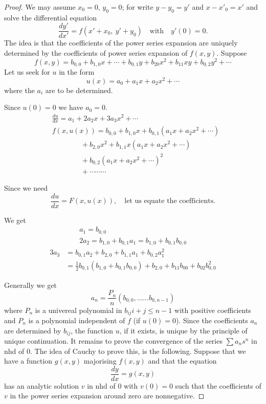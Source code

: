 \begin{proof}
We may assume $x_{0}=0$, $y_{0}=0$; for write $y-y_{0}=y'$ and $x-x'_{0}=x'$ and solve the differential equation
$$
\frac{dy'}{dx'}=f(x'+x_{0}, \ y'+y_{0})\quad\text{with}\quad y'(0)=0.
$$
The idea is that the coefficients of the power series expansion are uniquely determined by the coefficients of power series expansion of $f(x,y)$. Suppose
$$
f(x,y)=b_{0,0}+b_{1,0}x+\cdots+b_{0,1}y+b_{20}x^{2}+b_{11}xy+b_{0,2}y^{2}+\cdots
$$
Let us seek for $u$ in the form
$$
u(x)=a_{0}+a_{1}x+a_{2}x^{2}+\cdots
$$
where the $a_{i}$ are to be determined.

Since $u(0)=0$ we have $a_{0}=0$.
\begin{align*}
& \frac{du}{dx}=a_{1}+2a_{2}x+3a_{3}x^{2}+\cdots\\[3pt]
& f(x,u(x))=b_{0,0}+b_{1,0}x+b_{0,1}(a_{1}x+a_{2}x^{2}+\cdots)\\[3pt]
&\qquad\qquad + b_{2,0}x^{2}+b_{1,1}x(a_{1}x+a_{2}x^{2}+\cdots)\\[3pt]
&\qquad\qquad +b_{0,2}(a_{1}x+a_{2}x^{2}+\cdots )^{2}\\[3pt]
&\qquad\qquad +\cdots\cdots\cdots
\end{align*}

Since we need
$$
\frac{du}{dx}=F(x,u(x)),\quad\text{let us equate the coefficients.}
$$

We get
\begin{gather*}
a_{1}=b_{0,0}\\[3pt]
2a_{2}=b_{1,0}+b_{0,1}a_{1}=b_{1,0}+b_{0,1}b_{0,0}
\end{gather*}
\begin{align*}
3a_{3} &= b_{0,1}a_{2}+b_{2,0}+b_{1,1}a_{1}+b_{0,2}a^{2}_{1}\\[3pt]
&= \frac{1}{2}b_{0,1}(b_{1,0}+b_{0,1}b_{0,0})+b_{2,0}+b_{11}b_{00}+b_{02}b^{2}_{0,0}
\end{align*}\pageoriginale

Generally we get
$$
a_{n}=\frac{P_{n}}{n}\left(b_{0,0},\ldots\ldots b_{0,n-1}\right)
$$
where $P_{n}$ is a univereal polynomial in $b_{ij}i+j\leq n-1$ with positive coefficients and $P_{n}$ is a polynomial independent of $f$ (if $u(0)=0$). Since the coefficients $a_{n}$ are determined by $b_{ij}$, the function $u$, if it exists, is unique by the principle of unique continuation. It remains to prove the convergence of the series $\sum a_{n}s^{n}$ in nhd of $0$. The idea of Cauchy to prove this, is the following. Suppose that we have a function $g(x,y)$ majorising $f(x,y)$ and that the equation
$$
\dfrac{dy}{dx}=g(x,y)
$$
has an analytic solution $v$ in nhd of 0 with $v(0)=0$ such that the coefficients of $v$ in the power series expansion around zero are nonnegative.


\end{proof}
